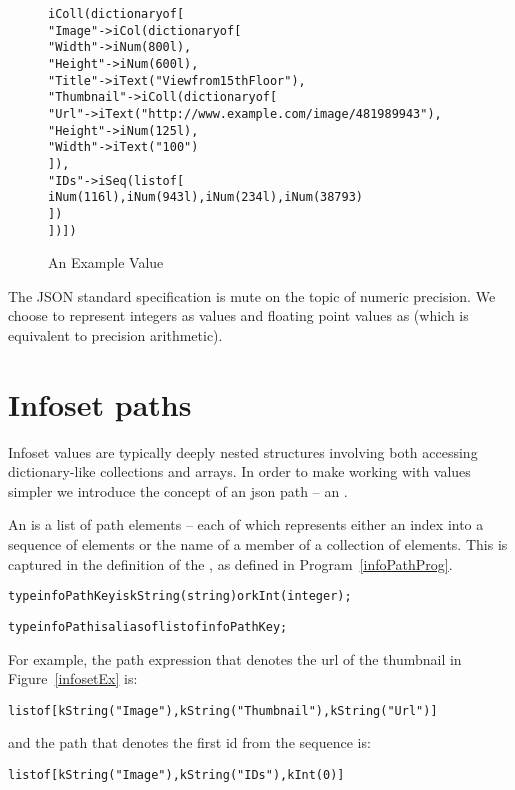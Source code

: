 \begin{figure}[hbt]
\begin{alltt}
iColl(dictionary of [
  "Image" -> iCol(dictionary of [
    "Width" -> iNum(800l),
    "Height" -> iNum(600l),
    "Title" -> iText("View from 15th Floor"),
    "Thumbnail" -> iColl(dictionary of [
      "Url" -> iText("http://www.example.com/image/481989943"),
      "Height" -> iNum(125l),
      "Width" -> iText("100")
    ]),
    "IDs" -> iSeq(list of [ 
      iNum(116l), iNum(943l), iNum(234l), iNum(38793)
    ])
  ])])
\end{alltt}
\caption{An Example  Value}
\label{infosetEx}
\end{figure}

\begin{aside}
The JSON standard specification is mute on the topic of numeric precision. We choose to represent integers as  values and floating point values as  (which is equivalent to  precision arithmetic).
\end{aside}

\section{Infoset paths}
\label{infoPath}

Infoset values are typically deeply nested structures involving both accessing dictionary-like collections and arrays. In order to make working with  values simpler we introduce the concept of an json path -- an .

An  is a list of path elements -- each of which represents either an index into a sequence of  elements or the name of a member of a collection of elements. This is captured in the definition of the , as defined in Program~\vref{infoPathProg}.
\begin{program}
\begin{alltt}
type infoPathKey is kString(string) or kInt(integer);

type infoPath is alias of list of infoPathKey;
\end{alltt}
\caption{The  and  Types\label{infoPathProg}}
\end{program}

For example, the path expression that denotes the url of the thumbnail in Figure~\vref{infosetEx} is:
\begin{alltt}
list of [kString("Image"), kString("Thumbnail"), kString("Url")]
\end{alltt}
and the path that denotes the first id from the  sequence is:
\begin{alltt}
list of [kString("Image"), kString("IDs"), kInt(0)]
\end{alltt}


